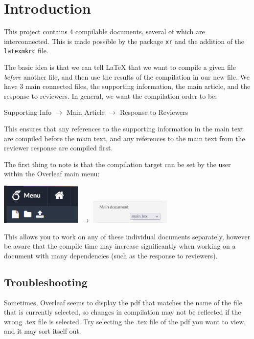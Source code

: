 \section{Introduction}
This project contains 4 compilable documents, several of which are interconnected.
This is made possible by the package \verb|xr| and the addition of the \verb|latexmkrc| file.

The basic idea is that we can tell LaTeX that we want to compile a given file \textit{before} another file, and then use the results of the compilation in our new file.
We have 3 main connected files, the supporting information, the main article, and the response to reviewers.
In general, we want the compilation order to be:
\begin{center}
    Supporting Info $\to$ Main Article $\to$ Response to Reviewers
\end{center}
This ensures that any references to the supporting information in the main text are compiled before the main text, and any references to the main text from the reviewer response are compiled first.

The first thing to note is that the compilation target can be set by the user within the Overleaf main menu:
\begin{center}
    \includegraphics[width=0.3\textwidth,keepaspectratio]{tutorial/OverleafMenu.png} $\to$
    \includegraphics[width=0.3\textwidth,keepaspectratio]{tutorial/MainDoc.png}
\end{center}
This allows you to work on any of these individual documents separately, however be aware that the compile time may increase significantly when working on a document with many dependencies (such as the response to reviewers).
\subsection{Troubleshooting}
Sometimes, Overleaf seems to display the pdf that matches the name of the file that is currently selected, so changes in compilation may not be reflected if the wrong .tex file is selected.
Try selecting the .tex file of the pdf you want to view, and it may sort itself out.

